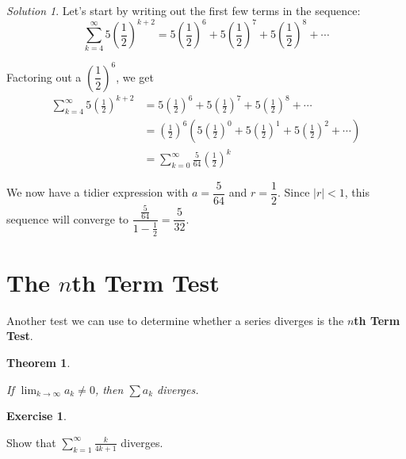 \documentclass[
]{book}
\newtheorem{theorem}{Theorem}[chapter]
\theoremstyle{definition}
\theoremstyle{definition}
\theoremstyle{definition}
\newtheorem{exercise}{Exercise}[chapter]
\theoremstyle{definition}
\theoremstyle{remark}
\newtheorem*{solution}{Solution}
\begin{document}
\begin{solution}

Let's start by writing out the first few terms in the sequence: \[\sum_{k=4}^\infty 5 \left (\frac{1}{2} \right)^{k+2} = 5\left ( \frac{1}{2} \right)^6 + 5\left ( \frac{1}{2} \right)^7 + 5\left ( \frac{1}{2} \right)^8+\cdots \]

Factoring out a \(\left ( \dfrac{1}{2}\right)^6\), we get
\begin{align*}
\sum_{k=4}^\infty 5 \left (\frac{1}{2} \right)^{k+2} &= 5\left ( \frac{1}{2} \right)^6 + 5\left ( \frac{1}{2} \right)^7 + 5\left ( \frac{1}{2} \right)^8+\cdots \\
& = \left ( \frac{1}{2} \right)^6 \left(5\left ( \frac{1}{2}\right )^0+5\left ( \frac{1}{2}\right )^1+5\left ( \frac{1}{2}\right )^2 +\cdots \right)\\
&= \sum_{k=0}^\infty \frac{5}{64} \left ( \frac{1}{2}\right )^k
\end{align*}

We now have a tidier expression with \(a=\dfrac{5}{64}\) and \(r=\dfrac{1}{2}\). Since \(|r|<1\), this sequence will converge to \(\dfrac{\frac{5}{64}}{1-\frac{1}{2}}=\dfrac{5}{32}\).

\end{solution}

\hypertarget{the-nth-term-test}{%
\section{\texorpdfstring{The \(n\)th Term Test}{The nth Term Test}}\label{the-nth-term-test}}

Another test we can use to determine whether a series diverges is the \textbf{\(n\)th Term Test}.

\begin{theorem}
\protect\hypertarget{thm:unlabeled-div-182}{}\label{thm:unlabeled-div-182}

If \(\displaystyle \lim_{k\to\infty}a_k\neq 0\), then \(\displaystyle \sum a_k\) diverges.

\end{theorem}

\begin{exercise}
\protect\hypertarget{exr:unlabeled-div-183}{}\label{exr:unlabeled-div-183}

Show that \(\displaystyle \sum_{k=1}^\infty \frac{k}{4k+1}\) diverges.

\end{exercise}
\end{document}
